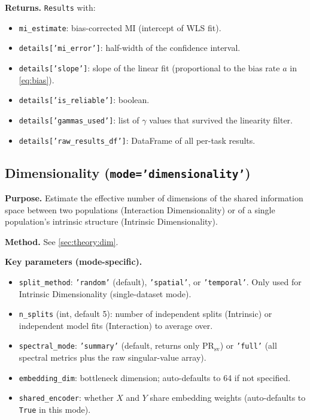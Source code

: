 \documentclass[12pt]{article}
\newcommand{\api}[1]{\texttt{#1}}
\begin{document}
\textbf{Returns.}  \api{Results} with:
\begin{itemize}[leftmargin=*]
  \item \api{mi\_estimate}: bias-corrected MI (intercept of WLS fit).
  \item \api{details['mi\_error']}: half-width of the confidence interval.
  \item \api{details['slope']}: slope of the linear fit (proportional to
        the bias rate $a$ in \cref{eq:bias}).
  \item \api{details['is\_reliable']}: boolean.
  \item \api{details['gammas\_used']}: list of $\gamma$ values that
        survived the linearity filter.
  \item \api{details['raw\_results\_df']}: DataFrame of all per-task results.
\end{itemize}

\subsection{Dimensionality (\texttt{mode='dimensionality'})}
\label{sec:modes:dimensionality}

\textbf{Purpose.}  Estimate the effective number of dimensions of the
shared information space between two populations (Interaction Dimensionality)
or of a single population's intrinsic structure (Intrinsic Dimensionality).

\textbf{Method.}  See \cref{sec:theory:dim}.

\textbf{Key parameters (mode-specific).}
\begin{itemize}[leftmargin=*]
  \item \api{split\_method}: \api{'random'} (default), \api{'spatial'},
        or \api{'temporal'}.  Only used for Intrinsic Dimensionality
        (single-dataset mode).
  \item \api{n\_splits} (int, default 5): number of independent splits
        (Intrinsic) or independent model fits (Interaction) to average over.
  \item \api{spectral\_mode}: \api{'summary'} (default, returns only
        $\mathrm{PR}_{\mathrm{sv}}$) or \api{'full'} (all spectral metrics
        plus the raw singular-value array).
  \item \api{embedding\_dim}: bottleneck dimension; auto-defaults to 64 if
        not specified.
  \item \api{shared\_encoder}: whether $X$ and $Y$ share embedding weights
        (auto-defaults to \api{True} in this mode).
\end{itemize}
\end{document}
